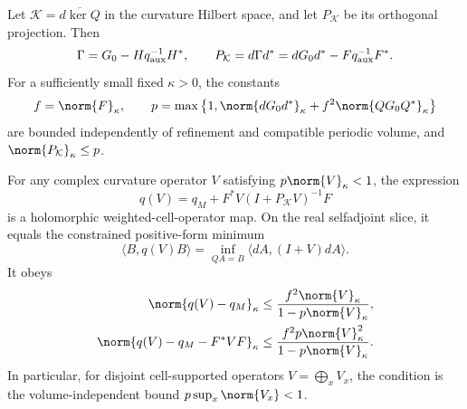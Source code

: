 \begin{theorem}\label{curv-theorem}
Let $\mathcal K=\overline{d\ker Q}$ in the curvature Hilbert space,
and let $P_{\mathcal K}$ be its orthogonal projection. Then
\begin{equation}\label{curv-projection}
 \Gamma=G_0-Hq_{\rm aux}^{-1}H^*,\qquad
 P_{\mathcal K}=d\Gamma d^*
   =dG_0d^*-Fq_{\rm aux}^{-1}F^*.
\end{equation}
For a sufficiently small fixed $\kappa>0$, the constants
\begin{equation}\label{curv-local-constants}
 f=\norm{F}_\kappa,\qquad
 p=\max\left\{1,\norm{dG_0d^*}_\kappa
                  +f^2\norm{QG_0Q^*}_\kappa\right\}
\end{equation}
are bounded independently of refinement and compatible periodic
volume, and $\norm{P_{\mathcal K}}_\kappa\le p$.

For any complex curvature operator $V$ satisfying
$p\norm{V}_\kappa<1$, the expression
\begin{equation}\label{curv-holomorphic-action}
 q(V)=q_M+F^*V(I+P_{\mathcal K}V)^{-1}F
\end{equation}
is a holomorphic weighted-cell-operator map. On the real selfadjoint
slice, it equals the constrained positive-form minimum
\begin{equation}\label{curv-real-minimum}
 \langle B,q(V)B\rangle
   =\inf_{QA=B}\langle dA,(I+V)dA\rangle.
\end{equation}
It obeys
\begin{align}
 \norm{q(V)-q_M}_\kappa
   &\le\frac{f^2\norm{V}_\kappa}{1-p\norm{V}_\kappa},
       \label{curv-first-bound}\\
 \norm{q(V)-q_M-F^*VF}_\kappa
   &\le\frac{f^2p\norm{V}_\kappa^2}{1-p\norm{V}_\kappa}.
       \label{curv-remainder-bound}
\end{align}
In particular, for disjoint cell-supported operators
$V=\bigoplus_x V_x$, the condition is the volume-independent bound
$p\sup_x\norm{V_x}<1$.
\end{theorem}

